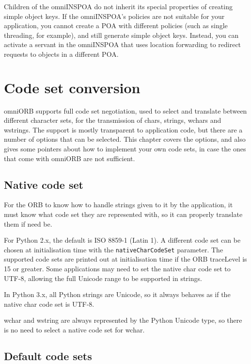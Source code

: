 \documentclass[11pt,oneside,a4paper]{book}
\newcommand{\code}[1]{\texttt{#1}}
\begin{document}
Children of the omniINSPOA do not inherit its special properties of
creating simple object keys. If the omniINSPOA's policies are not
suitable for your application, you cannot create a POA with different
policies (such as single threading, for example), and still generate
simple object keys. Instead, you can activate a servant in the
omniINSPOA that uses location forwarding to redirect requests to
objects in a different POA.



\chapter{Code set conversion}
\label{chap:codesets}

omniORB supports full code set negotiation, used to select and
translate between different character sets, for the transmission of
chars, strings, wchars and wstrings. The support is mostly transparent
to application code, but there are a number of options that can be
selected. This chapter covers the options, and also gives some
pointers about how to implement your own code sets, in case the ones
that come with omniORB are not sufficient.


\section{Native code set}

For the ORB to know how to handle strings given to it by the
application, it must know what code set they are represented with, so
it can properly translate them if need be.

For Python 2.x, the default is ISO 8859-1 (Latin 1). A different code
set can be chosen at initialisation time with the
\code{nativeCharCodeSet} parameter. The supported code sets are
printed out at initialisation time if the ORB traceLevel is 15 or
greater. Some applications may need to set the native char code set to
UTF-8, allowing the full Unicode range to be supported in strings.

In Python 3.x, all Python strings are Unicode, so it always behaves as
if the native char code set is UTF-8.

wchar and wstring are always represented by the Python Unicode type,
so there is no need to select a native code set for wchar.


\section{Default code sets}
\end{document}
